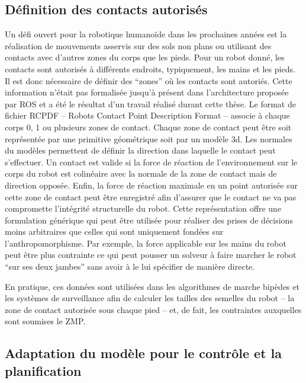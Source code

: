 \subsection{Définition des contacts autorisés}

Un défi ouvert pour la robotique humanoïde dans les prochaines années
est la réalisation de mouvements asservis sur des sols non plans ou
utilisant des contacts avec d'autres zones du corps que les
pieds. Pour un robot donné, les contacts sont autorisés à différents
endroits, typiquement, les mains et les pieds. Il est donc nécessaire
de définir des ``zones'' où les contacts sont autoriés. Cette
information n'était pas formalisée jusqu'à présent dans l'architecture
proposée par ROS et a été le résultat d'un travail réalisé durant
cette thèse. Le format de fichier RCPDF -- Robots Contact Point
Description Format -- associe à chaque corps 0, 1 ou plusieurs zones
de contact. Chaque zone de contact peut être soit représentée par une
primitive géométrique soit par un modèle 3d. Les normales du modèles
permettent de définir la direction dans laquelle le contact peut
s'effectuer. Un contact est valide si la force de réaction de
l'environnement sur le corps du robot est colinéaire avec la normale
de la zone de contact mais de direction opposée. Enfin, la force de
réaction maximale en un point autorisée sur cette zone de contact peut
être enregistré afin d'assurer que le contact ne va pas compromette
l'intégrité structurelle du robot. Cette représentation offre une
formulation générique qui peut être utilisée pour réaliser des prises
de décisions moins arbitraires que celles qui sont uniquement fondées
sur l'anthropomorphisme. Par exemple, la force applicable sur les
mains du robot peut être plus contrainte ce qui peut pousser un
solveur à faire marcher le robot ``sur ses deux jambes'' sans avoir à
le lui spécifier de manière directe.

En pratique, ces données sont utilisées dans les algorithmes de marche
bipèdes et les systèmes de surveillance afin de calculer les tailles
des semelles du robot -- la zone de contact autorisée sous chaque pied
-- et, de fait, les contraintes auxquelles sont soumises le ZMP.


\subsection{Adaptation du modèle pour le contrôle et la planification}

